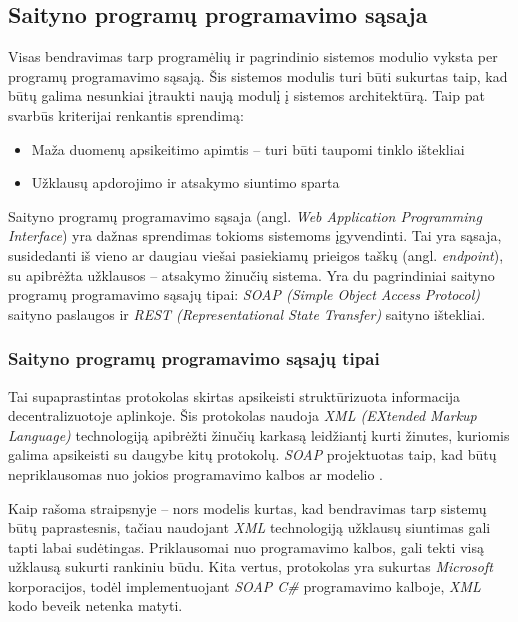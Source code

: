 \documentclass{VUMIFPSbakalaurinis}
\begin{document}
\subsection{Saityno programų programavimo sąsaja} \label{webApi}

Visas bendravimas tarp programėlių ir pagrindinio sistemos modulio vyksta per programų programavimo sąsają. Šis sistemos modulis turi būti sukurtas taip, kad būtų galima nesunkiai įtraukti naują modulį į sistemos architektūrą. Taip pat svarbūs kriterijai renkantis sprendimą:

\begin{itemize}
	\item Maža duomenų apsikeitimo apimtis – turi būti taupomi tinklo ištekliai
	\item Užklausų apdorojimo ir atsakymo siuntimo sparta
\end{itemize}

Saityno programų programavimo sąsaja (angl. \textit{Web Application Programming Interface}) yra dažnas sprendimas tokioms sistemoms įgyvendinti. Tai yra sąsaja, susidedanti iš vieno ar daugiau viešai pasiekiamų prieigos taškų (angl. \textit{endpoint}), su apibrėžta užklausos – atsakymo žinučių sistema. Yra du pagrindiniai saityno programų programavimo sąsajų tipai: \textit{SOAP (Simple Object Access Protocol)} saityno paslaugos ir \textit{REST (Representational State Transfer)} saityno ištekliai.

\subsubsection{Saityno programų programavimo sąsajų tipai}


Tai supaprastintas protokolas skirtas apsikeisti struktūrizuota informacija decentralizuotoje aplinkoje. Šis protokolas naudoja \textit{XML (EXtended Markup Language)} technologiją apibrėžti žinučių karkasą leidžiantį kurti žinutes, kuriomis galima apsikeisti su daugybe kitų protokolų. \textit{SOAP} projektuotas taip, kad būtų nepriklausomas nuo jokios programavimo kalbos ar modelio \cite{SoapDocs}.

Kaip rašoma straipsnyje \cite{SoapRest} – nors modelis kurtas, kad bendravimas tarp sistemų būtų paprastesnis, tačiau naudojant \textit{XML} technologiją užklausų siuntimas gali tapti labai sudėtingas. Priklausomai nuo programavimo kalbos, gali tekti visą užklausą sukurti rankiniu būdu. Kita vertus, protokolas yra sukurtas \textit{Microsoft} korporacijos, todėl implementuojant \textit{SOAP C\#} programavimo kalboje, \textit{XML} kodo beveik netenka matyti.
\end{document}
